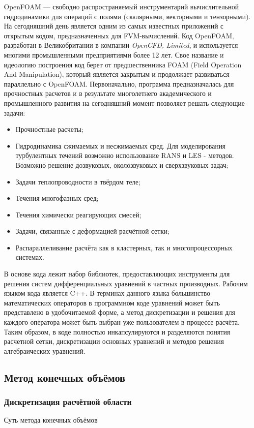 \documentclass[pdftex,a4paper,12pt]{article}
\begin{document}
		\hspace{2em}OpenFOAM — свободно распространяемый инструментарий вычислительной гидродинамики для операций с полями (скалярными, векторными и тензорными). На сегодняшний день является одним из самых известных приложений с открытым кодом, предназначенных для FVM-вычислений.\cite{openfoam}
		Код OpenFOAM, разработан в Великобритании в компании \textit{OpenCFD, Limited}, и используется многими промышленными предприятиями более 12 лет. Свое название и идеологию построения код берет от предшественника FOAM (Field Operation And Manipulation), который является закрытым и продолжает развиваться параллельно с OpenFOAM. Первоначально, программа предназначалась для прочностных расчетов и в результате многолетнего академического и промышленного развития на сегодняшний момент позволяет решать следующие задачи:
	\begin{itemize}
		\item Прочностные расчеты;
		\item Гидродинамика сжимаемых и несжимаемых сред. Для моделирования турбулентных течений возможно использование RANS и LES - методов. Возможно решение дозвуковых, околозвуковых и сверхзвуковых задач;
		\item Задачи теплопроводности в твёрдом теле;
		\item Течения многофазных сред;
		\item Течения химически реагирующих смесей;
		\item Задачи, связанные с деформацией расчётной сетки;
		\item Распараллеливание расчёта как в кластерных, так и многопроцессорных системах.
	\end{itemize}

	В основе кода лежит набор библиотек, предоставляющих инструменты для решения систем дифференциальных уравнений в частных производных. Рабочим языком кода является C++. В терминах данного языка большинство математических операторов в программном коде уравнений может быть представлено в удобочитаемой форме, а метод дискретизации и решения для каждого оператора может быть выбран уже пользователем в процессе расчёта. Таким образом, в коде полностью инкапсулируются и разделяются понятия расчетной сетки, дискретизации основных уравнений и методов решения алгебраических уравнений.
	\newpage
	\subsection{Метод конечных объёмов}
		\subsubsection{Дискретизация расчётной области}
			Суть метода конечных объёмов 
\end{document}
